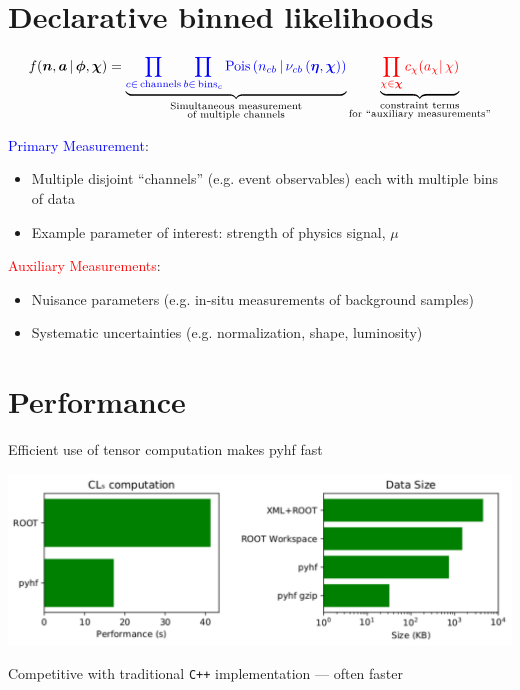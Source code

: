 \documentclass[a0,portrait]{a0poster}
\begin{document}
\begin{multicols}{2}
 \section*{\LARGE\color{MediumBlue} Declarative binned likelihoods}

 \[
  f(\bm{n}, \bm{a} \,|\,\bm{\phi},\bm{\chi}) = \underbrace{\color{blue}{\prod_{c\in\mathrm{\,channels}} \prod_{b \in \mathrm{\,bins}_c}\textrm{Pois}\left(n_{cb} \,\middle|\, \nu_{cb}\left(\bm{\eta},\bm{\chi}\right)\right)}}_{\substack{\text{Simultaneous measurement}\\%
    \text{of multiple channels}}} \underbrace{\color{red}{\prod_{\chi \in \bm{\chi}} c_{\chi}(a_{\chi} |\, \chi)}}_{\substack{\text{constraint terms}\\%
    \text{for }\text{``auxiliary measurements''}}}
 \]

 \noindent\textcolor{blue}{Primary Measurement}:
 \begin{itemize}
  \item Multiple disjoint ``channels'' (e.g. event observables) each with multiple bins of data
  \item Example parameter of interest: strength of physics signal, $\mu$
 \end{itemize}
 \textcolor{red}{Auxiliary Measurements}:
 \begin{itemize}
  \item Nuisance parameters (e.g. in-situ measurements of background samples)
  \item Systematic uncertainties (e.g. normalization, shape, luminosity)
 \end{itemize}

 \section*{\LARGE\color{MediumBlue} Performance}
 Efficient use of tensor computation makes pyhf fast
 \begin{center}
  \includegraphics[width=0.9\linewidth]{performance_only.pdf}
 \end{center}
 Competitive with traditional \texttt{C++} implementation --- often faster


\end{multicols}
\end{document}

